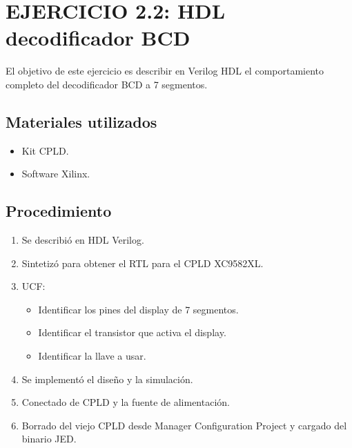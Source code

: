 \section{EJERCICIO 2.2: HDL decodificador BCD}\sangria{} El objetivo de este ejercicio es describir en Verilog HDL el comportamiento completo del decodificador BCD a 7 segmentos.\subsection{Materiales utilizados}\begin{itemize}[nosep]\item Kit CPLD. \item Software Xilinx.\end{itemize}\subsection{Procedimiento}\begin{enumerate}[nosep]\item Se describió en HDL Verilog. \item Sintetizó para obtener el RTL para el CPLD XC9582XL. \item UCF: \begin{itemize}[nosep]\item Identificar los pines del display de 7 segmentos. \item Identificar el transistor que activa el display. \item Identificar la llave a usar. \end{itemize}\item Se implementó el diseño y la simulación. \item Conectado de CPLD y la fuente de alimentación. \item Borrado del viejo CPLD desde Manager Configuration Project y cargado del binario JED. \end{enumerate}
